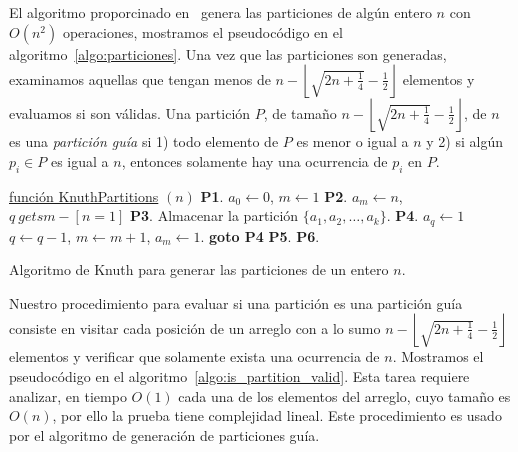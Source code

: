     El algoritmo proporcinado en~\cite{Knuth2011} genera las particiones de algún entero
    $n$ con $O(n^2)$ operaciones, mostramos el pseudocódigo en el
    algoritmo~\ref{algo:particiones}. Una vez que las particiones son generadas,
    examinamos aquellas que tengan menos de $n - \left\lfloor\sqrt{2n + \frac{1}{4}} -
    \frac{1}{2}\right\rfloor$ elementos y evaluamos si son válidas. Una partición $P$, de
    tamaño $n -\left\lfloor\sqrt{2n + \frac{1}{4}} - \frac{1}{2}\right\rfloor$, de $n$ es
    una \emph{partición guía} si 1) todo elemento de $P$ es menor o igual a $n$ y 2) si algún $p_i\in P$ es
    igual a $n$, entonces solamente hay una ocurrencia de $p_i$ en $P$.
    \begin{algorithm}[htpb]
      \DontPrintSemicolon
      \underline{función KnuthPartitions} $(n)$\;
      \textbf{P1}. $a_0 \gets 0$, $m\gets 1$\;
      \textbf{P2}. $a_m \gets n$, $q \ gets m - [n=1]$\;
      \textbf{P3}. Almacenar la partición $\{a_1,a_2,\dots,a_k\}$.\;
      \textbf{P4}. $a_q \gets 1$ $q \gets q-1$, $m \gets m+1$, $a_m \gets 1$.\;
      \textbf{goto P4}\;
      \textbf{P5}. 
      \textbf{P6}. 
      \caption{Algoritmo de Knuth para generar las particiones de un entero $n$.}
      \label{algo:particiones}
    \end{algorithm}

    Nuestro procedimiento para evaluar si una partición es una partición guía consiste en visitar
    cada posición de un arreglo con a lo sumo $n - \left\lfloor\sqrt{2n + \frac{1}{4}} -
    \frac{1}{2}\right\rfloor$ elementos y verificar que solamente exista una ocurrencia
    de $n$. Mostramos el pseudocódigo en el algoritmo~\ref{algo:is_partition_valid}. Esta tarea
    requiere analizar, en tiempo $O(1)$ cada una de los elementos del arreglo, cuyo tamaño es
    $O(n)$, por ello la prueba tiene complejidad lineal. Este procedimiento es usado por el
    algoritmo de generación de particiones guía.

